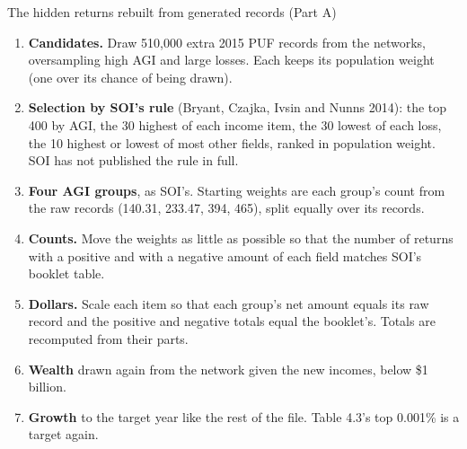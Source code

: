 \begin{frame}{The hidden returns rebuilt from generated records (Part A)}
  \footnotesize
  \begin{enumerate}\setlength{\itemsep}{1pt}
    \item \textbf{Candidates.} Draw 510,000 extra 2015 PUF records from the networks, oversampling high AGI
          and large losses. Each keeps its population weight (one over its chance of being drawn).
    \item \textbf{Selection by SOI's rule} (Bryant, Czajka, Ivsin and Nunns 2014): the top 400 by AGI, the 30
          highest of each income item, the 30 lowest of each loss, the 10 highest or lowest of most other fields,
          ranked in population weight. SOI has not published the rule in full.
    \item \textbf{Four AGI groups}, as SOI's. Starting weights are each group's count from the raw records
          (140.31, 233.47, 394, 465), split equally over its records.
    \item \textbf{Counts.} Move the weights as little as possible so that the number of returns with a
          positive and with a negative amount of each field matches SOI's booklet table.
    \item \textbf{Dollars.} Scale each item so that each group's net amount equals its raw record and the
          positive and negative totals equal the booklet's. Totals are recomputed from their parts.
    \item \textbf{Wealth} drawn again from the network given the new incomes, below \$1 billion.
    \item \textbf{Growth} to the target year like the rest of the file. Table 4.3's top 0.001\% is a target again.
  \end{enumerate}
\end{frame}

